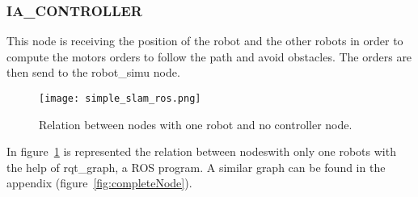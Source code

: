 \subsubsection*{IA\_CONTROLLER}

This node is receiving the position of the robot and the other robots in order to compute the motors orders to follow the path and avoid obstacles. The orders are then send to the robot\_simu node.

\begin{figure}[H]
\centering
\texttt{[image: simple\_slam\_ros.png]}
\caption{Relation between nodes with one robot and no controller node.}
\label{fig:oneRobGraph}
\end{figure}

In figure~\ref{fig:oneRobGraph} is represented the relation between nodeswith only one robots with the help of rqt\_graph, a ROS program. A  similar graph can be found in the appendix (figure~\ref{fig:completeNode}).